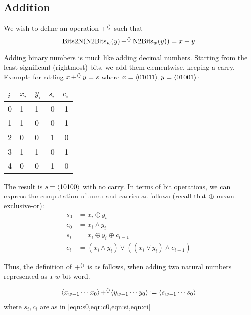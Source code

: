 \subsection{Addition}
\label{sec:bit-addition}

We wish to define an operation $\operatorname{+^{\langle\rangle}}$ such that
\begin{equation}
  \mathrm{Bits2N}(\mathrm{N2Bits}_{w}(y)\operatorname{+^{\langle\rangle}}{}\mathrm{N2Bits}_{w}(y)) = x + y
\end{equation}

Adding binary numbers is much like adding decimal numbers.  Starting
from the least significant (rightmost) bits, we add them elementwise,
keeping a carry.  Example for adding $x\operatorname{+^{\langle\rangle}}{} y=s$ where
$x=\langle 01011 \rangle, y=\langle 01001 \rangle$:

\begin{center}
\begin{tabular}{l|llrr}
  $i$ & $x_{i}$ & $y_{i}$ & $s_{i}$ & $c_{i}$ \\\hline
  0 & 1 & 1 & 0 & 1 \\
  1 & 1 & 0 & 0 & 1 \\
  2 & 0 & 0 & 1 & 0 \\
  3 & 1 & 1 & 0 & 1 \\
  4 & 0 & 0 & 1 & 0
\end{tabular}
\end{center}

The result is $s=\langle 10100 \rangle$ with no carry.  In terms of bit
operations, we can express the computation of sums and carries as
follows (recall that $\oplus$ means exclusive-or):
\begin{align}
  s_{0} &= x_{i} \oplus y_{i} \label{eqn:s0} \\
  c_{0} &= x_{i} \land y_{i} \label{eqn:c0} \\
  s_{i} &= x_{i} \oplus y_{i} \oplus c_{i-1} \label{eqn:si} \\
  c_{i} &= (x_{i} \land y_{i})\lor ((x_{i}\lor y_{i})\land c_{i-1}) \label{eqn:ci}
\end{align}

Thus, the definition of $\operatorname{+^{\langle\rangle}}$ is as follows, when adding two
natural numbers represented as a $w$-bit word.
\begin{definition}
\begin{align*}
  \langle x_{w-1}\cdots{}x_{0} \rangle \operatorname{+^{\langle\rangle}} \langle y_{w-1}\cdots{}y_{0} \rangle \vcentcolon=
  \langle s_{w-1}\cdots{}s_{0} \rangle
\end{align*}
where $s_{i},c_{i}$ are as in \cref{eqn:s0,eqn:c0,eqn:si,eqn:ci}.
\label{def:intadd}
\end{definition}

